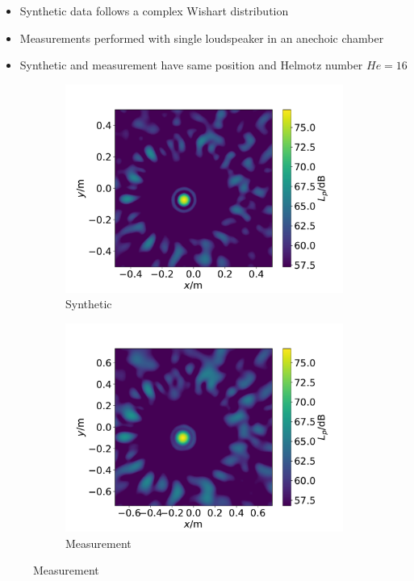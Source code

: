 \documentclass[12pt,pdftex,16x10]{elpres} %
\begin{document}
\begin{psli}
  

  \begin{itemize}
    \item Synthetic data follows a complex Wishart distribution
    \item Measurements performed with single loudspeaker in an anechoic chamber
    \item Synthetic and measurement have same position and Helmotz number $He = 16$ %
  \end{itemize}

  \begin{figure}[h]
    \begin{subfigure}[b]{0.45\linewidth}
      \centering
      \includegraphics[width=0.75\linewidth]{figs/datasets_beamforming_example_synthetic.pdf} 
      \caption{Synthetic} 
    \end{subfigure}%
    \begin{subfigure}[b]{0.45\linewidth}
      \centering
      \includegraphics[width=0.75\linewidth]{figs/datasets_beamforming_example_measurement.pdf} 
      \caption{Measurement}
    \end{subfigure}
  \end{figure}
  
\end{psli}
\end{document}
